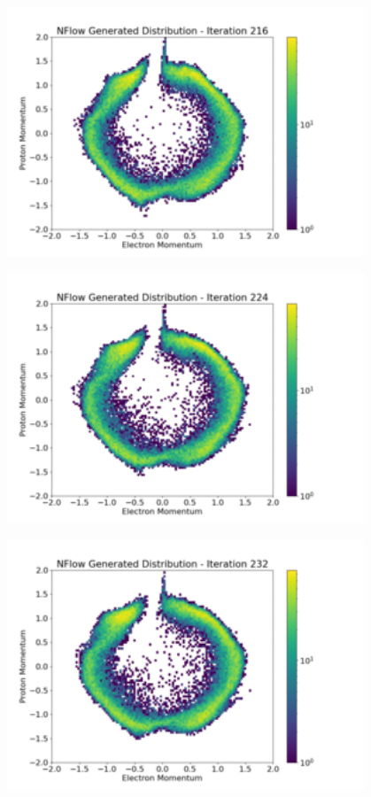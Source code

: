 \documentclass[aspectratio=169]{beamer}
\begin{document}
\begin{frame}[noframenumbering]\centering\includegraphics[width=0.8\textwidth]{images/400training/400training-27.png}\end{frame}
\begin{frame}[noframenumbering]\centering\includegraphics[width=0.8\textwidth]{images/400training/400training-28.png}\end{frame}
\begin{frame}[noframenumbering]\centering\includegraphics[width=0.8\textwidth]{images/400training/400training-29.png}\end{frame}
\end{document}
